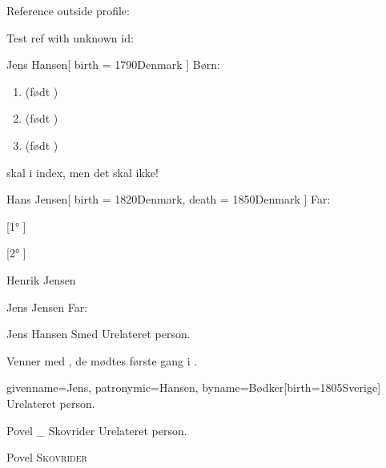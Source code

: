 \documentclass[
	twocolumn
]{article}
\begin{document}
Reference outside profile: 

Test ref with unknown id: 

\begin{gprProfile}{Jens Hansen}[
	birth = {1790}{Denmark}
]
	Børn:
	\begin{enumerate}
	\item {} (født )
	\item {} (født )
	\item {} (født )
	\end{enumerate}

	 skal i index, men det skal  ikke!
\end{gprProfile}

\begin{gprProfile}{Hans Jensen}[
	birth = {1820}{Denmark},
	death = {1850}{Denmark}
]
	Far:

	[1° ]

	[2° ]
\end{gprProfile}

\begin{gprProfile}{Henrik Jensen}
	
	\lipsum[1-5]

\end{gprProfile}

\begin{gprProfile}[id=ABC]{Jens Jensen}
	Far:

\end{gprProfile}

\begin{gprProfile}{Jens Hansen Smed}
	Urelateret person.
	
	Venner med , de mødtes første gang i .

\end{gprProfile}

\begin{gprProfile*}{givenname=Jens, patronymic=Hansen, byname=Bødker}[birth={1805}{Sverige}]
	Urelateret person.

\end{gprProfile*}

\begin{gprProfile}{Povel _ Skovrider}
	Urelateret person.
	
	\gprStyledName
	
	{\gprGivenName{} {\scshape \gprByname}}
	
	{Povel {\scshape Skovrider}}

\end{gprProfile}
\end{document}
